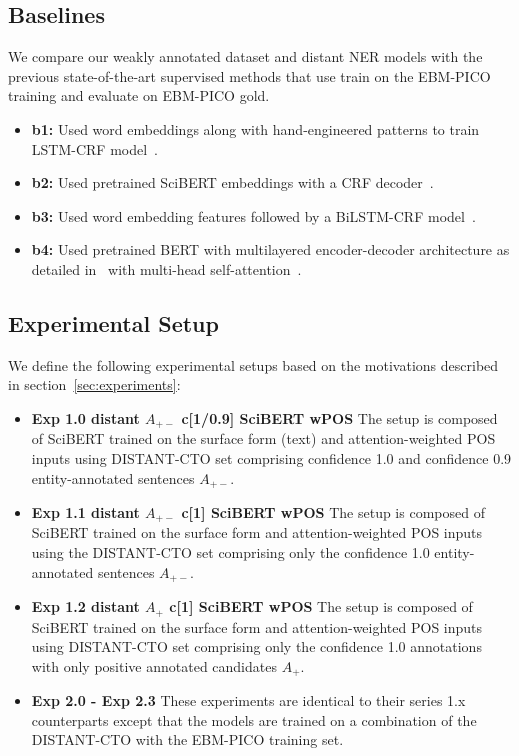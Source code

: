 \documentclass[letterpaper]{article} %
\begin{document}
\subsection{Baselines}
\label{subsec:base}
%
We compare our weakly annotated dataset and distant NER models with the previous state-of-the-art supervised methods that use train on the EBM-PICO training and evaluate on EBM-PICO gold.
\begin{itemize}
    \item \textbf{b1:} Used word embeddings along with hand-engineered patterns to train LSTM-CRF model~\cite{nye2018corpus}.
    \item \textbf{b2:} Used pretrained SciBERT embeddings with a CRF decoder~\cite{beltagy2019scibert}.
    \item \textbf{b3:} Used word embedding features followed by a BiLSTM-CRF model~\cite{brockmeier2019improving}.
    \item \textbf{b4:} Used pretrained BERT with multilayered encoder-decoder architecture as detailed in~\cite{vaswani2017attention} with multi-head self-attention~\cite{stylianou2021transformed}.
\end{itemize}
%
\subsection{Experimental Setup}
\label{subsec:expsetup}
%
We define the following experimental setups based on the motivations described in section~\ref{sec:experiments}:
\begin{itemize}
    \item \textbf{Exp 1.0 distant $A_{+-}$ c[1/0.9] SciBERT wPOS} The setup is composed of SciBERT trained on the surface form (text) and attention-weighted POS inputs using DISTANT-CTO set comprising confidence 1.0 and confidence 0.9 entity-annotated sentences $A_{+-}$.
    \item \textbf{Exp 1.1 distant $A_{+-}$ c[1] SciBERT wPOS} The setup is composed of SciBERT trained on the surface form and attention-weighted POS inputs using the DISTANT-CTO set comprising only the confidence 1.0 entity-annotated sentences $A_{+-}$.
    \item \textbf{Exp 1.2 distant $A_{+}$ c[1] SciBERT wPOS} The setup is composed of SciBERT trained on the surface form and attention-weighted POS inputs using DISTANT-CTO set comprising only the confidence 1.0 annotations with only positive annotated candidates $A_{+}$.
    \item \textbf{Exp 2.0 - Exp 2.3 } These experiments are identical to their series 1.x counterparts except that the models are trained on a combination of the DISTANT-CTO with the EBM-PICO training set.
\end{itemize}
%
\end{document}
